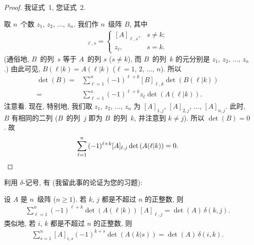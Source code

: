 \begin{proof}
    我证式~1, 您证式~2.

    取 \(n\)~个数 \(z_1\), \(z_2\), \(\dots\), \(z_n\).
    我们作 \(n\)~级阵 \(B\), 其中
    \begin{align*}
        [B]_{\ell, s} =
        \begin{cases}
            [A]_{\ell, s}, & s \neq k; \\
            z_\ell,        & s = k.
        \end{cases}
    \end{align*}
    (通俗地, \(B\)~的列~\(s\) 等于 \(A\)~的列 \(s\)
    (\(s \neq k\)),
    而 \(B\)~的列~\(k\) 的元分别是
    \(z_1\), \(z_2\), \(\dots\), \(z_n\).)
    由此可见, \(B(\ell|k) = A(\ell|k)\)
    (\(\ell = 1\), \(2\), \(\dots\), \(n\)).
    所以
    \begin{align*}
        \det {(B)}
        = {} & \sum_{\ell = 1}^{n}
        {(-1)^{\ell + k} [B]_{\ell, k} \det {(B(\ell|k))}}
        \\
        = {} & \sum_{\ell = 1}^{n}
        {(-1)^{\ell + k} z_\ell \det {(A(\ell|k))}}.
    \end{align*}
    注意看.
    现在, 特别地, 我们取
    \(z_1\), \(z_2\), \(\dots\), \(z_n\)
    为
    \([A]_{1,j}\), \([A]_{2,j}\), \(\dots\), \([A]_{n,j}\).
    此时, \(B\) 有相同的二列
    (\(B\)~的列~\(j\) 即为 \(B\)~的列~\(k\),
    并注意到 \(k \neq j\)).
    所以 \(\det {(B)} = 0\).
    故
    \begin{equation*}
        \sum_{\ell = 1}^{n}
        {(-1)^{\ell+k} [A]_{\ell,j} \det {(A(\ell|k))}}
        = 0.
        \qedhere
    \end{equation*}
\end{proof}

利用 \(\delta\)-记号, 有
(我留此事的论证为您的习题):

\begin{theorem}
    设 \(A\) 是 \(n\)~级阵 (\(n \geq 1\)).
    若 \(k\), \(j\) 都是不超过 \(n\) 的正整数,
    则
    \begin{align*}
        \sum_{\ell = 1}^{n}
        {(-1)^{\ell+k} \det {(A(\ell|k))}\, [A]_{\ell,j}}
        = \det {(A)}\, \delta(k, j).
    \end{align*}
    类似地, 若 \(i\), \(k\) 都是不超过 \(n\) 的正整数,
    则
    \begin{align*}
        \sum_{s = 1}^{n}
        {[A]_{i,s} (-1)^{k+s} \det {(A(k|s))}}
        = \det{(A)}\, \delta(i, k).
    \end{align*}
\end{theorem}

